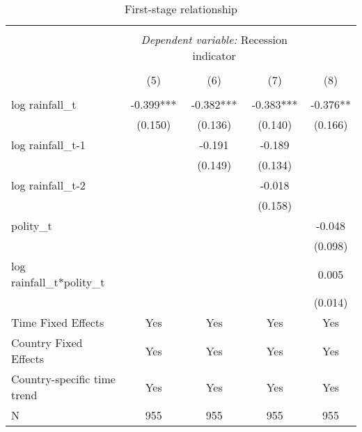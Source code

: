 \documentclass{article}
\begin{document}

\begin{table}
\caption{First-stage relationship}
\begin{center}
\begin{tabular}{lcccc}
\hline \\[-1.8ex] 
            & \multicolumn{3}{c}{\textit{Dependent variable:} Recession indicator} \\ 
\hline \\[-1.8ex]
                      &      (5)    &      (6)    &     (7)     &      (8)      \\
\hline \\[-1.8ex]
\midrule

log rainfall_{t}          & -0.399***  & -0.382***  & -0.383***  & -0.376**    \\
                      & (0.150)    & (0.136)    & (0.140)    & (0.166)     \\
log rainfall_{t-1}        &            & -0.191     & -0.189     &             \\
                      &            & (0.149)    & (0.134)    &             \\
log rainfall_{t-2}        &            &            & -0.018     &             \\
                      &            &            & (0.158)    &             \\
polity_{t}            &            &            &            & -0.048      \\
                      &            &            &            & (0.098)     \\
log rainfall_{t}*polity_{t}  &            &            &            & 0.005       \\
                      &            &            &            & (0.014)     \\

Time Fixed Effects    & Yes         & Yes         & Yes         & Yes      \\
Country Fixed Effects & Yes         & Yes         & Yes         & Yes      \\
Country-specific 
time trend            & Yes         & Yes         & Yes         & Yes      \\
N                     & 955        & 955        & 955        & 955         \\
\hline
\end{tabular}
\end{center}
\end{table}
\end{document}
